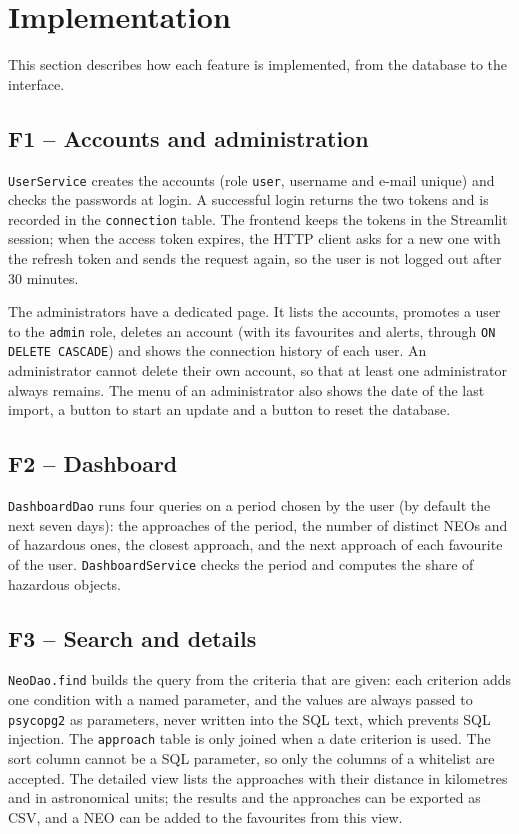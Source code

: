 \section{Implementation}
\label{sec:implementation}

This section describes how each feature is implemented, from the database to the interface.

\subsection{F1 -- Accounts and administration}

\texttt{UserService} creates the accounts (role \texttt{user}, username and e-mail unique) and
checks the passwords at login. A successful login returns the two tokens and is recorded in the
\texttt{connection} table. The frontend keeps the tokens in the Streamlit session; when the access
token expires, the HTTP client asks for a new one with the refresh token and sends the request
again, so the user is not logged out after 30 minutes.

The administrators have a dedicated page. It lists the accounts, promotes a user to the
\texttt{admin} role, deletes an account (with its favourites and alerts, through
\texttt{ON DELETE CASCADE}) and shows the connection history of each user. An administrator
cannot delete their own account, so that at least one administrator always remains. The menu of
an administrator also shows the date of the last import, a button to start an update and a
button to reset the database.

\subsection{F2 -- Dashboard}

\texttt{DashboardDao} runs four queries on a period chosen by the user (by default the next seven
days): the approaches of the period, the number of distinct NEOs and of hazardous ones, the
closest approach, and the next approach of each favourite of the user. \texttt{DashboardService}
checks the period and computes the share of hazardous objects.

\subsection{F3 -- Search and details}

\texttt{NeoDao.find} builds the query from the criteria that are given: each criterion adds one
condition with a named parameter, and the values are always passed to \texttt{psycopg2} as
parameters, never written into the SQL text, which prevents SQL injection. The \texttt{approach}
table is only joined when a date criterion is used. The sort column cannot be a SQL parameter, so
only the columns of a whitelist are accepted. The detailed view lists the approaches with their
distance in kilometres and in astronomical units; the results and the approaches can be exported
as CSV, and a NEO can be added to the favourites from this view.

